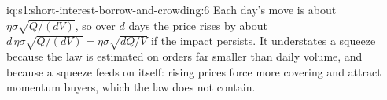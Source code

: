 \begin{solution}{iq:s1:short-interest-borrow-and-crowding:6}
Each day's move is about $\eta\sigma\sqrt{Q/(dV)}$, so over $d$ days the price rises by about $d\,\eta\sigma\sqrt{Q/(dV)} = \eta\sigma\sqrt{dQ/V}$ if the
impact persists. It understates a squeeze because the law is estimated on orders far smaller than daily volume, and because a squeeze feeds on itself:
rising prices force more covering and attract momentum buyers, which the law does not contain.
\end{solution}
